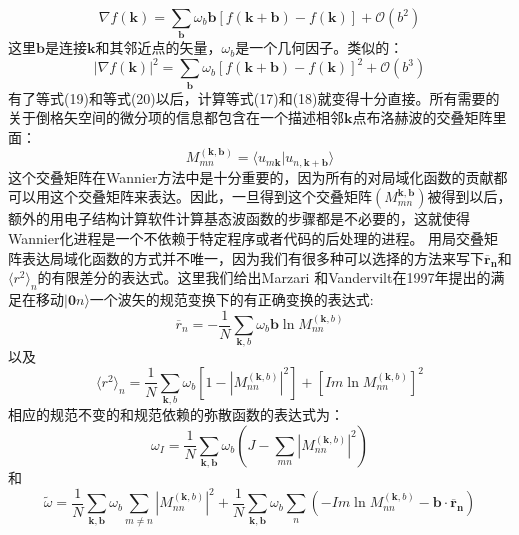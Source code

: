 \begin{equation}
\nabla f(\bm{k})=\sum_{\bm{b}}\omega_b\bm{b}[f(\bm{k}+\bm{b})-f(\bm{k})]+\mathcal{O}(b^2)
\end{equation}
这里$\bm{b}$是连接$\bm{k}$和其邻近点的矢量，$\omega_b$是一个几何因子。类似的：
\begin{equation}
|\nabla f(\bm{k})|^2=\sum_{\bm{b}}\omega_b[f(\bm{k}+\bm{b})-f(\bm{k})]^2+\mathcal{O}(b^3)
\end{equation}
有了等式(19)和等式(20)以后，计算等式(17)和(18)就变得十分直接。所有需要的关于倒格矢空间的微分项的信息都包含在一个描述相邻$\bm{k}$点布洛赫波的交叠矩阵里面：
\begin{equation}
M^{(\bm{k},\bm{b})}_{mn}=\langle u_{m \bm{k}}|u_{n,\bm{k}+\bm{b}} \rangle
\end{equation}
这个交叠矩阵在Wannier方法中是十分重要的，因为所有的对局域化函数的贡献都可以用这个交叠矩阵来表达。因此，一旦得到这个交叠矩阵$(M^{\bm{k},\bm{b}}_{mn})$被得到以后，额外的用电子结构计算软件计算基态波函数的步骤都是不必要的，这就使得Wannier化进程是一个不依赖于特定程序或者代码的后处理的进程。
用局交叠矩阵表达局域化函数的方式并不唯一，因为我们有很多种可以选择的方法来写下$\bm{\overline r_n}$和$\langle r^2\rangle_n$的有限差分的表达式。这里我们给出Marzari 和Vandervilt在1997年提出的满足在移动$|\bm{0}n \rangle$一个波矢的规范变换下的有正确变换的表达式:
\begin{equation}
\overline r_{n}=-\frac{1}{N}\sum_{\bm{k},b}\omega_b\bm{b}\ln M^{(\bm{k},b)}_{nn}
\end{equation}
以及
\begin{equation}
\langle r^2\rangle_{n}=\frac{1}{N}\sum_{\bm{k},b}\omega_b{[1-|M^{(\bm{k},b)}_{nn}|^2]+[Im \ln M^{(\bm{k},b)}_{nn} ]^2}
\end{equation}
相应的规范不变的和规范依赖的弥散函数的表达式为：
\begin{equation}
\omega_I=\frac{1}{N}\sum_{\bm{k},\bm{b}}\omega_b(J-\sum_{mn}|M^{(\bm{k},b)}_{nn}|^2)
\end{equation}
和
\begin{equation}
\widetilde \omega=\frac{1}{N}\sum_{\bm{k},\bm{b}}\omega_b\sum_{m \neq n}|M^{(\bm{k},b)}_{nn}|^2+\frac{1}{N}\sum_{\bm{k},\bm{b}}\omega_b\sum_{n}(-Im \ln M^{(\bm{k},b)}_{nn}-\bm{b} \cdot \bm{\overline r_n})
\end{equation}

